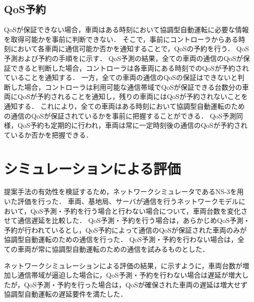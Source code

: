 \documentclass[a4paper,10pt,twocolumn,uplatex]{jsarticle}
\begin{document}
\subsection{QoS予約}
QoSが保証できない場合，車両はある時刻において協調型自動運転に必要な情報を取得可能かを事前に判断できない．
そこで，事前にコントローラからある時刻において各車両に通信可能か否かを通知することで，QoSの予約を行う．
QoS予測および予約の手順をに示す．
QoS予測の結果，全ての車両の通信のQoSが保証できると判断した場合，コントローラは各車両にある時刻でのQoSが予約されていることを通知する．
一方，全ての車両の通信のQoSの保証はできないと判断した場合，コントローラは利用可能な通信帯域でQoSが保証できる台数分の車両にQoSが予約されることを通知し，残りの車両にはQoSが予約されないことを通知する．
これにより，全ての車両はある時刻において協調型自動運転のための通信のQoSが保証されているかを事前に把握することができる．
QoS予測同様，QoS予約も定期的に行われ，車両は常に一定時刻後の通信のQoSが予約されているか否かを把握できる．

\section{シミュレーションによる評価}
\label{simulation}
提案手法の有効性を検証するため，ネットワークシミュレータであるNS-3\cite{ns3}を用いた評価を行った．
車両、基地局、サーバが通信を行うネットワークモデルにおいて，QoS予測・予約を行う場合と行わない場合について，車両台数を変化させて通信遅延を比較した．
QoS予測・予約を行う場合は，あらかじめQoS予測・予約が行われているとし，QoS予約によって通信のQoSが保証された車両のみが協調型自動運転のための通信を行った．
QoS予測・予約を行わない場合は，全ての車両が常に協調型自動運転のための通信を試みるものとした．\par
ネットワークシミュレーションによる評価の結果，に示すように，車両台数が増加し通信帯域が逼迫した場合に，QoS予測・予約を行わない場合は遅延が増大したが，QoS予測・予約を行った場合は，QoSが確保された車両の遅延は増大せず協調型自動運転の遅延要件を満たした．
\end{document}
